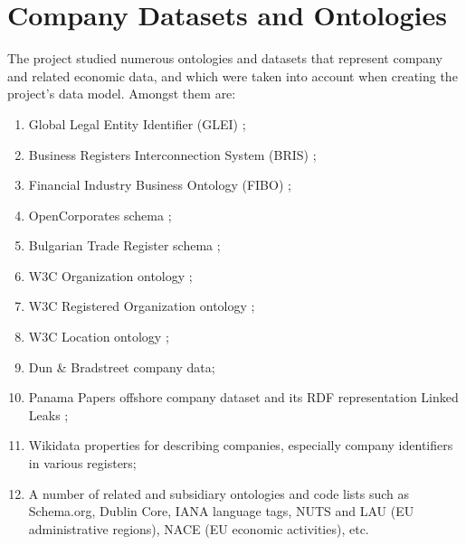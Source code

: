 \documentclass[runningheads,a4paper]{llncs}
\begin{document}
\section{Company Datasets and Ontologies}

The project studied numerous ontologies and datasets that represent company and related economic data, and which were taken into account when creating the project's data model. Amongst them are:
\begin{enumerate}
\item Global Legal Entity Identifier (GLEI)  \cite{_Ref491193712};
\item Business Registers Interconnection System (BRIS)  \cite{_Ref491193639} \cite{_Ref491194142};
\item Financial Industry Business Ontology (FIBO)  \cite{_Ref491193410};
\item OpenCorporates schema  \cite{_Ref491194336};
\item Bulgarian Trade Register schema  \cite{_Ref491193979};
\item W3C Organization ontology  \cite{_Ref491194417};
\item W3C Registered Organization ontology  \cite{__RefNumPara__857_1597909725};
\item W3C Location ontology  \cite{_Ref491194659};
\item Dun \& Bradstreet company data;
\item Panama Papers offshore company dataset  \cite{_Ref491193106} and its RDF representation Linked Leaks  \cite{_Ref491193118};
\item Wikidata properties for describing companies, especially company identifiers in various registers;
\item A number of related and subsidiary ontologies and code lists such as Schema.org, Dublin Core, IANA language tags, NUTS and LAU (EU administrative regions), NACE (EU economic activities), etc.
\end{enumerate}
\end{document}
